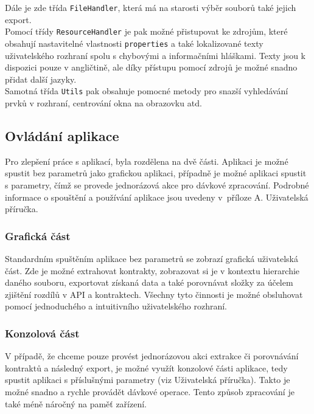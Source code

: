 				Dále je zde třída \texttt{FileHandler}, která má na starosti výběr souborů také jejich export.\\
				
				Pomocí třídy \texttt{ResourceHandler} je pak možné přistupovat ke zdrojům, které obsahují nastavitelné vlastnosti \texttt{properties} a také lokalizované texty uživatelského rozhraní spolu s chybovými a informačními hláškami. Texty jsou k dispozici pouze v angličtině, ale díky přístupu pomocí zdrojů je možné snadno přidat další jazyky.\\
				
				Samotná třída \texttt{Utils} pak obsahuje pomocné metody pro snazší vyhledávání prvků v rozhraní, centrování okna na obrazovku atd.		
		
	    	   
	   \subsection{Ovládání aplikace}
	   		Pro zlepšení práce s aplikací, byla rozdělena na dvě části. Aplikaci je možné spustit bez parametrů jako grafickou aplikaci, případně je možné aplikaci spustit s parametry, čímž se provede jednorázová akce pro dávkové zpracování. Podrobné informace o spouštění a používání aplikace jsou uvedeny v~příloze A. Uživatelská příručka.
	   		
	   		\subsubsection{Grafická část}
	   			Standardním spuštěním aplikace bez parametrů se zobrazí grafická uživatelská část. Zde je možné extrahovat kontrakty, zobrazovat si je v kontextu hierarchie daného souboru, exportovat získaná data a také porovnávat složky za účelem zjištění rozdílů v API a kontraktech. Všechny tyto činnosti je možné obsluhovat pomocí jednoduchého a intuitivního uživatelského rozhraní.			   			  		
	   		\subsubsection{Konzolová část}
	   			V případě, že chceme pouze provést jednorázovou akci extrakce či porovnávání kontraktů a následný export, je možné využít konzolové části aplikace, tedy spustit aplikaci s příslušnými parametry (viz Uživatelská příručka). Takto je možné snadno a rychle provádět dávkové operace. Tento způsob zpracování je také méně náročný na paměť zařízení.
	   
